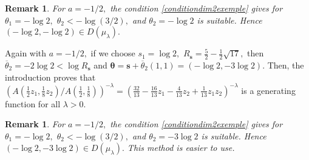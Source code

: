 \documentclass[a4paper,oneside,notitlepage]{article}%
\newtheorem{remark}[theorem]{Remark}
\begin{document}
\begin{remark}
For $a=-1/2,$ the condition \ref{conditiondim2exemple} gives for $\theta
_{1}=-\log2,$ $\theta_{2}<-\log\left(  3/2\right)  ,$ and $\theta_{2}=-\log2$
is suitable. Hence $\left(  -\log2,-\log2\right)  \in D\left(  \mu_{\lambda
}\right)  .$
\end{remark}

Again with $a=-1/2,$ if we choose $s_{1}=\log2,$ $R_{\mathbf{s}}=\frac{5}%
{2}-\frac{1}{2}\sqrt{17},$ then $\overline{\theta}_{2}=-2\log2<\log
R_{\mathbf{s}}$ and $\mathbf{\theta}=\mathbf{s}+\overline{\theta}_{2}\left(
1,1\right)  =\allowbreak\left(  -\log2,-3\log2\right)  $. Then, the
introduction proves that $(A\left(  \frac{1}{2}z_{1},\frac{1}{8}z_{2}\right)
/A\left(  \frac{1}{2},\frac{1}{8}\right)  )^{-\lambda}=\left(  \frac{32}%
{13}-\frac{16}{13}z_{1}-\frac{4}{13}z_{2}+\frac{1}{13}z_{1}z_{2}\right)
^{-\lambda}$ is a generating function for all $\lambda>0$.

\begin{remark}
For $a=-1/2,$ the condition \ref{conditiondim2exemple} gives for $\theta
_{1}=-\log2,$ $\theta_{2}<-\log\left(  3/2\right)  ,$ and $\theta_{2}=-3\log2$
is suitable. Hence $\left(  -\log2,-3\log2\right)  \in D\left(  \mu_{\lambda
}\right)  .$ This method is easier to use.
\end{remark}
\end{document}
